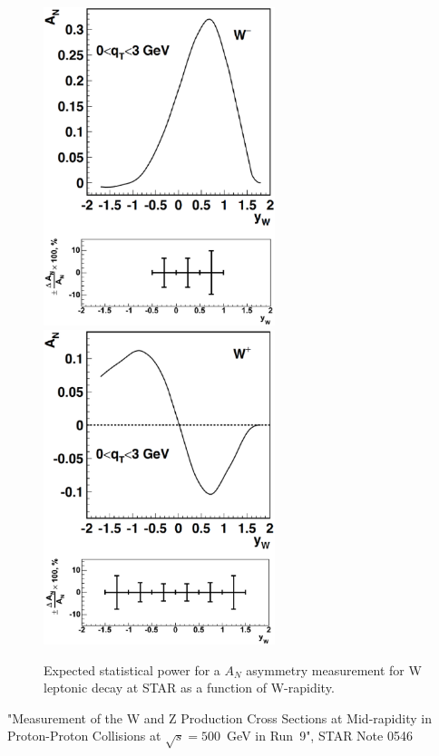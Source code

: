 \documentclass[12pt]{article}
\begin{document}
\begin{figure}[tbhp]
\begin{center}
\includegraphics[width=6.75cm]{images/anapow_w_minus.eps}
\includegraphics[width=6.75cm]{images/anapow_w_plus.eps}
\end{center}
\caption{\label{fig:MC_Wmeas_stat} Expected statistical power for a $A_N$ asymmetry measurement for W leptonic decay at STAR as a function of W-rapidity.}
\end{figure}



\begin{thebibliography}{9}

"Measurement of the W and Z Production Cross Sections at Mid-rapidity in
Proton-Proton Collisions at $\sqrt{s} = 500$~GeV in Run~9", STAR Note 0546

\end{thebibliography}
\end{document}
